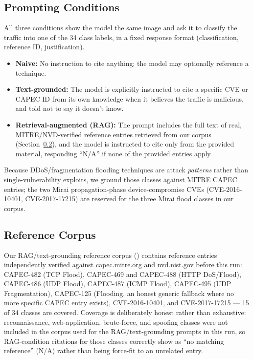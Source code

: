 \documentclass[10pt,twocolumn]{article}
\newcommand{\code}[1]{\texttt{\detokenize{#1}}}
\begin{document}
\subsection{Prompting Conditions}

All three conditions show the model the same image and ask it to classify the traffic into one of the 34 class labels, in a fixed response format (classification, reference ID, justification).

\begin{itemize}[nosep]
\item \textbf{Naive:} No instruction to cite anything; the model may optionally reference a technique.
\item \textbf{Text-grounded:} The model is explicitly instructed to cite a specific CVE or CAPEC ID from its own knowledge when it believes the traffic is malicious, and told not to say it doesn't know.
\item \textbf{Retrieval-augmented (RAG):} The prompt includes the full text of real, MITRE/NVD-verified reference entries retrieved from our corpus (Section~\ref{sec:corpus}), and the model is instructed to cite only from the provided material, responding ``N/A'' if none of the provided entries apply.
\end{itemize}

Because DDoS/fragmentation flooding techniques are attack \emph{patterns} rather than single-vulnerability exploits, we ground those classes against MITRE CAPEC entries; the two Mirai propagation-phase device-compromise CVEs (CVE-2016-10401, CVE-2017-17215) are reserved for the three Mirai flood classes in our corpus.

\subsection{Reference Corpus}
\label{sec:corpus}

Our RAG/text-grounding reference corpus (\code{cve_corpus.json}) contains reference entries independently verified against capec.mitre.org and nvd.nist.gov before this run: CAPEC-482 (TCP Flood), CAPEC-469 and CAPEC-488 (HTTP DoS/Flood), CAPEC-486 (UDP Flood), CAPEC-487 (ICMP Flood), CAPEC-495 (UDP Fragmentation), CAPEC-125 (Flooding, an honest generic fallback where no more specific CAPEC entry exists), CVE-2016-10401, and CVE-2017-17215 --- 15 of 34 classes are covered. Coverage is deliberately honest rather than exhaustive: reconnaissance, web-application, brute-force, and spoofing classes were not included in the corpus used for the RAG/text-grounding prompts in this run, so RAG-condition citations for those classes correctly show as ``no matching reference'' (N/A) rather than being force-fit to an unrelated entry.
\end{document}
